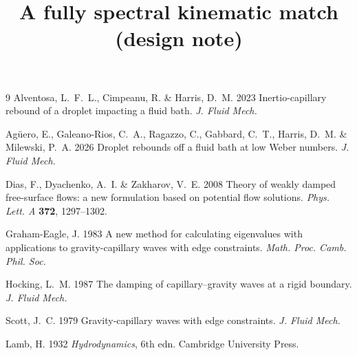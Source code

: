 \documentclass[11pt]{article}
\title{A fully spectral kinematic match\\ \large (design note)}
\author{}
\date{}
\begin{document}
\maketitle



\begin{thebibliography}{9}
Alventosa, L.~F.~L., Cimpeanu, R. \& Harris, D.~M. 2023
Inertio-capillary rebound of a droplet impacting a fluid bath.
\textit{J. Fluid Mech.}

Ag\"uero, E., Galeano-Rios, C.~A., Ragazzo, C., Gabbard, C.~T., Harris, D.~M. \& Milewski, P.~A. 2026
Droplet rebounds off a fluid bath at low Weber numbers.
\textit{J. Fluid Mech.}

Dias, F., Dyachenko, A.~I. \& Zakharov, V.~E. 2008
Theory of weakly damped free-surface flows: a new formulation based on potential flow solutions.
\textit{Phys. Lett. A} \textbf{372}, 1297--1302.

Graham-Eagle, J. 1983
A new method for calculating eigenvalues with applications to gravity-capillary waves with edge constraints.
\textit{Math. Proc. Camb. Phil. Soc.}

Hocking, L.~M. 1987
The damping of capillary--gravity waves at a rigid boundary.
\textit{J. Fluid Mech.}

Scott, J.~C. 1979
Gravity-capillary waves with edge constraints.
\textit{J. Fluid Mech.}

Lamb, H. 1932
\textit{Hydrodynamics}, 6th edn. Cambridge University Press.
\end{thebibliography}
\end{document}
